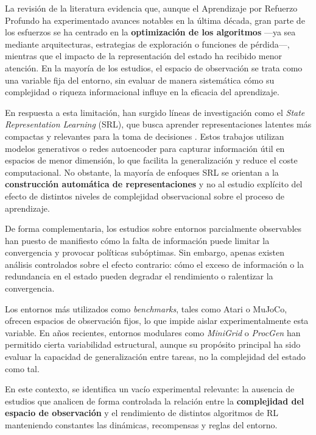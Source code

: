 La revisión de la literatura evidencia que, aunque el Aprendizaje por Refuerzo Profundo ha experimentado avances notables en la última década, gran parte de los esfuerzos se ha centrado en la \textbf{optimización de los algoritmos} —ya sea mediante arquitecturas, estrategias de exploración o funciones de pérdida—, mientras que el impacto de la representación del estado ha recibido menor atención.  
En la mayoría de los estudios, el espacio de observación se trata como una variable fija del entorno, sin evaluar de manera sistemática cómo su complejidad o riqueza informacional influye en la eficacia del aprendizaje.

En respuesta a esta limitación, han surgido líneas de investigación como el \textit{State Representation Learning} (SRL), que busca aprender representaciones latentes más compactas y relevantes para la toma de decisiones \citep{Lesort2018,Ha2018,Hafner2020}.  
Estos trabajos utilizan modelos generativos o redes autoencoder para capturar información útil en espacios de menor dimensión, lo que facilita la generalización y reduce el coste computacional.  
No obstante, la mayoría de enfoques SRL se orientan a la \textbf{construcción automática de representaciones} y no al estudio explícito del efecto de distintos niveles de complejidad observacional sobre el proceso de aprendizaje.

De forma complementaria, los estudios sobre entornos parcialmente observables \citep{Hausknecht2015} han puesto de manifiesto cómo la falta de información puede limitar la convergencia y provocar políticas subóptimas.  
Sin embargo, apenas existen análisis controlados sobre el efecto contrario: cómo el exceso de información o la redundancia en el estado pueden degradar el rendimiento o ralentizar la convergencia.  

Los entornos más utilizados como \textit{benchmarks}, tales como Atari o MuJoCo, ofrecen espacios de observación fijos, lo que impide aislar experimentalmente esta variable.  
En años recientes, entornos modulares como \textit{MiniGrid} \citep{ChevalierBoisvert2018} o \textit{ProcGen} \citep{Cobbe2020} han permitido cierta variabilidad estructural, aunque su propósito principal ha sido evaluar la capacidad de generalización entre tareas, no la complejidad del estado como tal.

En este contexto, se identifica un vacío experimental relevante: la ausencia de estudios que analicen de forma controlada la relación entre la \textbf{complejidad del espacio de observación} y el rendimiento de distintos algoritmos de RL manteniendo constantes las dinámicas, recompensas y reglas del entorno.  

